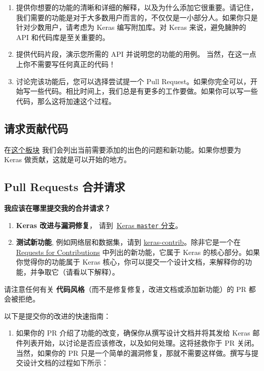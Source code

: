 \begin{enumerate}
\def\labelenumi{\arabic{enumi}.}
\item
  提供你想要的功能的清晰和详细的解释，以及为什么添加它很重要。请记住，我们需要的功能是对于大多数用户而言的，不仅仅是一小部分人。如果你只是针对少数用户，请考虑为
  Keras 编写附加库。对 Keras 来说，避免臃肿的 API 和代码库是至关重要的。
\item
  提供代码片段，演示您所需的 API 并说明您的功能的用例。
  当然，在这一点上你不需要写任何真正的代码！
\item
  讨论完该功能后，您可以选择尝试提一个 Pull
  Request。如果你完全可以，开始写一些代码。相比时间上，我们总是有更多的工作要做。如果你可以写一些代码，那么这将加速这个过程。
\end{enumerate}


\subsection{请求贡献代码}

在\href{https://github.com/keras-team/keras/projects/1}{这个板块}
我们会列出当前需要添加的出色的问题和新功能。如果你想要为 Keras
做贡献，这就是可以开始的地方。


\subsection{Pull Requests 合并请求}

\textbf{我应该在哪里提交我的合并请求？}

\begin{enumerate}
\def\labelenumi{\arabic{enumi}.}
\item
  \textbf{Keras 改进与漏洞修复}，
  请到~\href{https://github.com/keras-team/keras/tree/master}{Keras
  \texttt{master} 分支}。
\item
  \textbf{测试新功能}, 例如网络层和数据集，请到
  \href{https://github.com/farizrahman4u/keras-contrib}{keras-contrib}。除非它是一个在
  \href{https://github.com/keras-team/keras/projects/1}{Requests for
  Contributions} 中列出的新功能，它属于 Keras
  的核心部分。如果你觉得你的功能属于 Keras
  核心，你可以提交一个设计文档，来解释你的功能，并争取它（请看以下解释）。
\end{enumerate}

请注意任何有关
\textbf{代码风格}（而不是修复修复，改进文档或添加新功能）的 PR
都会被拒绝。

以下是提交你的改进的快速指南：

\begin{enumerate}
\def\labelenumi{\arabic{enumi}.}
\tightlist
\item
  如果你的 PR 介绍了功能的改变，确保你从撰写设计文档并将其发给 Keras
  邮件列表开始，以讨论是否应该修改，以及如何处理。这将拯救你于 PR
  关闭。当然，如果你的 PR
  只是一个简单的漏洞修复，那就不需要这样做。撰写与提交设计文档的过程如下所示：
\end{enumerate}

